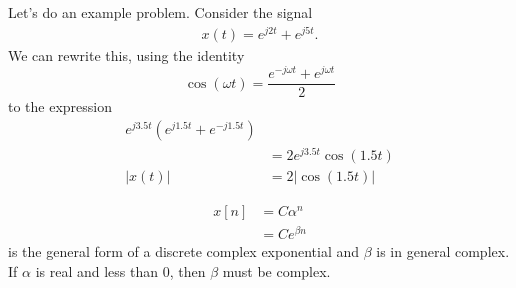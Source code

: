 Let's do an example problem. 
Consider the signal 
\begin{eqnarray}
    x(t) = e^{j2t} + e^{j5t}.
\end{eqnarray}
We can rewrite this, using 
the identity 
\begin{equation}
    \cos(\omega t) = \frac{e^{-j \omega t}+ e^{j\omega t}}{2}
\end{equation}
to the expression 
\begin{align}
    e^{j 3.5 t} (e^{j1.5t} + e^{-j 1.5 t}) \\
    &= 2 e^{j 3.5 t}\cos(1.5t) \\
    |x(t)| &= 2|\cos(1.5 t)|
\end{align}

\begin{align}
    x[n] &= C\alpha^n \\
    &= Ce^{\beta n}
\end{align}
is the general form of a discrete complex exponential and 
$\beta$ is in general complex. If $\alpha$ is real and less 
than 0, then $\beta$ must be complex. 
